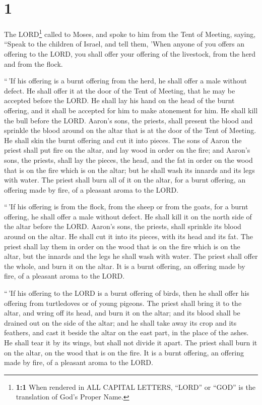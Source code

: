 \hypertarget{section}{%
\section{1}\label{section}}

 The LORD\footnote{\textbf{1:1} When rendered in ALL
  CAPITAL LETTERS, ``LORD'' or ``GOD'' is the translation of God's
  Proper Name.} called to Moses, and spoke to him from the Tent of
Meeting, saying,  ``Speak to the children of Israel, and
tell them, 'When anyone of you offers an offering to the LORD, you shall
offer your offering of the livestock, from the herd and from the flock.

 ``\,'If his offering is a burnt offering from the herd,
he shall offer a male without defect. He shall offer it at the door of
the Tent of Meeting, that he may be accepted before the LORD.
 He shall lay his hand on the head of the burnt offering,
and it shall be accepted for him to make atonement for him.
 He shall kill the bull before the LORD. Aaron's sons, the
priests, shall present the blood and sprinkle the blood around on the
altar that is at the door of the Tent of Meeting.  He
shall skin the burnt offering and cut it into pieces.  The
sons of Aaron the priest shall put fire on the altar, and lay wood in
order on the fire;  and Aaron's sons, the priests, shall
lay the pieces, the head, and the fat in order on the wood that is on
the fire which is on the altar;  but he shall wash its
innards and its legs with water. The priest shall burn all of it on the
altar, for a burnt offering, an offering made by fire, of a pleasant
aroma to the LORD.

 ``\,'If his offering is from the flock, from the sheep
or from the goats, for a burnt offering, he shall offer a male without
defect.  He shall kill it on the north side of the altar
before the LORD. Aaron's sons, the priests, shall sprinkle its blood
around on the altar.  He shall cut it into its pieces,
with its head and its fat. The priest shall lay them in order on the
wood that is on the fire which is on the altar,  but the
innards and the legs he shall wash with water. The priest shall offer
the whole, and burn it on the altar. It is a burnt offering, an offering
made by fire, of a pleasant aroma to the LORD.

 ``\,'If his offering to the LORD is a burnt offering of
birds, then he shall offer his offering from turtledoves or of young
pigeons.  The priest shall bring it to the altar, and
wring off its head, and burn it on the altar; and its blood shall be
drained out on the side of the altar;  and he shall take
away its crop and its feathers, and cast it beside the altar on the east
part, in the place of the ashes.  He shall tear it by its
wings, but shall not divide it apart. The priest shall burn it on the
altar, on the wood that is on the fire. It is a burnt offering, an
offering made by fire, of a pleasant aroma to the LORD.

